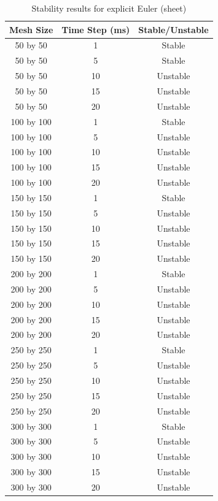 \begin{table}[tp]
   \begin{minipage}{\textwidth}
      \begin{center}
         \begin{tabular}{c|c|c}
           Mesh Size & Time Step (ms) & Stable/Unstable\\
           \hline
           50 by 50 & 1 & Stable\\
           50 by 50 & 5 & Stable\\
           50 by 50 & 10 & Unstable\\
           50 by 50 & 15 & Unstable\\
           50 by 50 & 20 & Unstable\\
           100 by 100 & 1 & Stable\\
           100 by 100 & 5 & Unstable\\
           100 by 100 & 10 & Unstable\\
           100 by 100 & 15 & Unstable\\
           100 by 100 & 20 & Unstable\\           
           150 by 150 & 1 & Stable\\
           150 by 150 & 5 & Unstable\\
           150 by 150 & 10 & Unstable\\
           150 by 150 & 15 & Unstable\\
           150 by 150 & 20 & Unstable\\           
           200 by 200 & 1 & Stable\\
           200 by 200 & 5 & Unstable\\
           200 by 200 & 10 & Unstable\\
           200 by 200 & 15 & Unstable\\
           200 by 200 & 20 & Unstable\\           
           250 by 250 & 1 & Stable\\
           250 by 250 & 5 & Unstable\\
           250 by 250 & 10 & Unstable\\
           250 by 250 & 15 & Unstable\\
           250 by 250 & 20 & Unstable\\           
           300 by 300 & 1 & Stable\\
           300 by 300 & 5 & Unstable\\
           300 by 300 & 10 & Unstable\\
           300 by 300 & 15 & Unstable\\
           300 by 300 & 20 & Unstable\\
         \end{tabular}
      \end{center}
   \end{minipage}
   \caption{Stability results for explicit Euler (sheet)}
   \label{tab:ee stability sheet}
\end{table}


